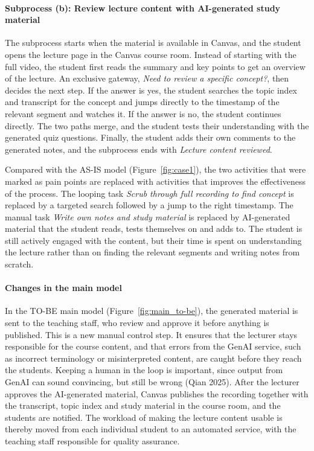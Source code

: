 \paragraph{Subprocess (b): Review lecture content with AI-generated study material}
The subprocess starts when the material is available in Canvas, and the student opens the lecture page in the Canvas course room. Instead of starting with the full video, the student first reads the summary and key points to get an overview of the lecture. An exclusive gateway, \textit{Need to review a specific concept?}, then decides the next step. If the answer is yes, the student searches the topic index and transcript for the concept and jumps directly to the timestamp of the relevant segment and watches it. If the answer is no, the student continues directly. The two paths merge, and the student tests their understanding with the generated quiz questions. Finally, the student adds their own comments to the generated notes, and the subprocess ends with \textit{Lecture content reviewed}. %

Compared with the AS-IS model (Figure~\ref{fig:case1}), the two activities that were marked as pain points are replaced with activities that improves the effectiveness of the process. The looping task \textit{Scrub through full recording to find concept} is replaced by a targeted search followed by a jump to the right timestamp. The manual task \textit{Write own notes and study material} is replaced by AI-generated material that the student reads, tests themselves on and adds to. The student is still actively engaged with the content, but their time is spent on understanding the lecture rather than on finding the relevant segments and writing notes from scratch.

\paragraph{Changes in the main model}
In the TO-BE main model (Figure~\ref{fig:main_to-be}), the generated material is sent to the teaching staff, who review and approve it before anything is published. This is a new manual control step. It ensures that the lecturer stays responsible for the course content, and that errors from the GenAI service, such as incorrect terminology or misinterpreted content, are caught before they reach the students. Keeping a human in the loop is important, since output from GenAI can sound convincing, but still be wrong (Qian 2025). After the lecturer approves the AI-generated material, Canvas publishes the recording together with the transcript, topic index and study material in the course room, and the students are notified. The workload of making the lecture content usable is thereby moved from each individual student to an automated service, with the teaching staff responsible for quality assurance. %






